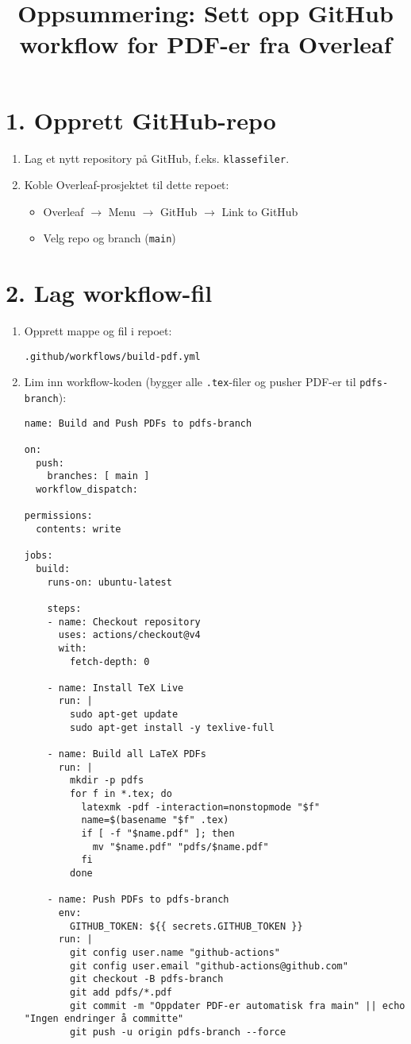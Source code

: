 \documentclass[a4paper,12pt]{article}
\title{Oppsummering: Sett opp GitHub workflow for PDF-er fra Overleaf}
\author{}
\date{}
\begin{document}
\maketitle

\section*{1. Opprett GitHub-repo}
\begin{enumerate}[label=\arabic*.]
    \item Lag et nytt repository på GitHub, f.eks. \texttt{klassefiler}.
    \item Koble Overleaf-prosjektet til dette repoet:
    \begin{itemize}
        \item Overleaf $\to$ Menu $\to$ GitHub $\to$ Link to GitHub
        \item Velg repo og branch (\texttt{main})
    \end{itemize}
\end{enumerate}

\section*{2. Lag workflow-fil}
\begin{enumerate}[label=\arabic*.]
    \item Opprett mappe og fil i repoet:
    \begin{verbatim}
.github/workflows/build-pdf.yml
    \end{verbatim}
    \item Lim inn workflow-koden (bygger alle \texttt{.tex}-filer og pusher PDF-er til \texttt{pdfs-branch}):
    \begin{verbatim}
name: Build and Push PDFs to pdfs-branch

on:
  push:
    branches: [ main ]
  workflow_dispatch:

permissions:
  contents: write

jobs:
  build:
    runs-on: ubuntu-latest

    steps:
    - name: Checkout repository
      uses: actions/checkout@v4
      with:
        fetch-depth: 0

    - name: Install TeX Live
      run: |
        sudo apt-get update
        sudo apt-get install -y texlive-full

    - name: Build all LaTeX PDFs
      run: |
        mkdir -p pdfs
        for f in *.tex; do
          latexmk -pdf -interaction=nonstopmode "$f"
          name=$(basename "$f" .tex)
          if [ -f "$name.pdf" ]; then
            mv "$name.pdf" "pdfs/$name.pdf"
          fi
        done

    - name: Push PDFs to pdfs-branch
      env:
        GITHUB_TOKEN: ${{ secrets.GITHUB_TOKEN }}
      run: |
        git config user.name "github-actions"
        git config user.email "github-actions@github.com"
        git checkout -B pdfs-branch
        git add pdfs/*.pdf
        git commit -m "Oppdater PDF-er automatisk fra main" || echo "Ingen endringer å committe"
        git push -u origin pdfs-branch --force
    \end{verbatim}
\end{enumerate}
\end{document}
